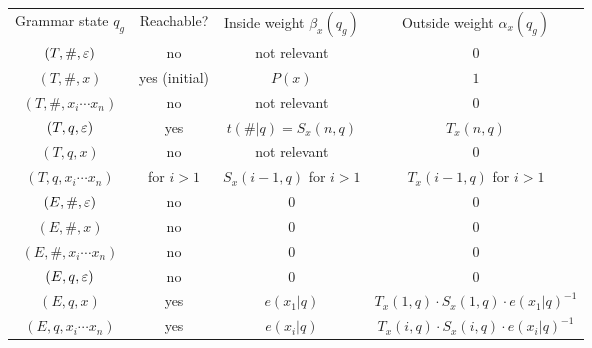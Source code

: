 \newcommand\mystrut{\rule[-0.6em]{0pt}{1.8em}}%
\newcommand\mute{\color{black!30}}
\begin{center}\begin{tabular}{|c|c||c|c|}%
 \hline\mystrut
 Grammar state $q_g$ & Reachable? & Inside weight $\beta_x(q_g)$ & Outside weight $\alpha_x(q_g)$
 \\\hhline{|=|=#=|=|}\mystrut
 \mute$(T,\#,\varepsilon)$ & \mute no & \mute not relevant & \mute0
 \\\hline\mystrut
 $(T,\#,x)$ & yes (initial) & $P(x)$ & $1$
 \\\hline\mystrut
 \mute$(T,\#,x_i\cdots x_n)$ & \mute no & \mute not relevant & \mute0
 \\\hline\mystrut
 $(T,q,\varepsilon)$ & yes & $t(\#|q)=S_x(n,q)$ & $T_x(n,q)$
 \\\hline\mystrut
 \mute$(T,q,x)$ & \mute no & \mute not relevant & \mute0
 \\\hline\mystrut
 $(T,q,x_i\cdots x_n)$ & for $i>1$ & $S_x(i-1,q)$ for $i>1$ & $T_x(i-1,q)$ for $i>1$
 \\\hhline{|=|=#=|=|}\mystrut
 \mute$(E,\#,\varepsilon)$ & \mute no & \mute0 & \mute0
 \\\hline\mystrut
 \mute$(E,\#,x)$ & \mute no & \mute0 & \mute0
 \\\hline\mystrut
 \mute$(E,\#,x_i\cdots x_n)$ & \mute no & \mute0 & \mute0
 \\\hline\mystrut
 \mute$(E,q,\varepsilon)$ & \mute no & \mute0 & \mute0
 \\\hline\mystrut
 $(E,q,x)$ & yes & $e(x_1|q)$ & $T_x(1,q) \cdot S_x(1,q) \cdot e(x_1|q)^{-1}$
 \\\hline\mystrut
 $(E,q,x_i\cdots x_n)$ & yes & $e(x_i|q)$ & $T_x(i,q) \cdot S_x(i,q) \cdot e(x_i|q)^{-1}$
 \\\hline
\end{tabular}\end{center}

\endinput
\clearpage
Let $c$ be an $V^*$-corpus. For all $q,q'\in Q$ and $v\in V$, the complete-data
corpus is defined by
\begin{align*}
 c\!\dangle{\omega,\mu_\uh}\mbig\kla{\#,(\#,T)} &= c(\eps), \\
 c\!\dangle{\omega,\mu_\uh}\mbig\kla{q,(\#,T)} &= \sum_{x\in\operatorname{supp}(h)\setminus\brc\eps} c(x) \cdot R_x(1,q), \\
 c\!\dangle{\omega,\mu_\uh}\mbig\kla{\#,(q,T)} &= \sum_{x\in\operatorname{supp}(h)\setminus\brc\eps} c(x) \cdot R_x\mbig\kla{\abs x,q}, \\
 c\!\dangle{\omega,\mu_\uh}\mbig\kla{q',(q,T)} &= \sum_{x\in\operatorname{supp}(h)\setminus\brc\eps} c(x) \cdot \sum_{i\in\brc{1,\ldots,\abs x-1}} U_x(i,q,q'), \\
 c\!\dangle{\omega,\mu_\uh}\mbig\kla{v,(q,E)} &= \sum_{x\in\operatorname{supp}(h)\setminus\brc\eps} c(x) \cdot \sum_{i\in\brc{1,\ldots,\abs x}: x_i=v} R_x(i,q), \\
\end{align*}
